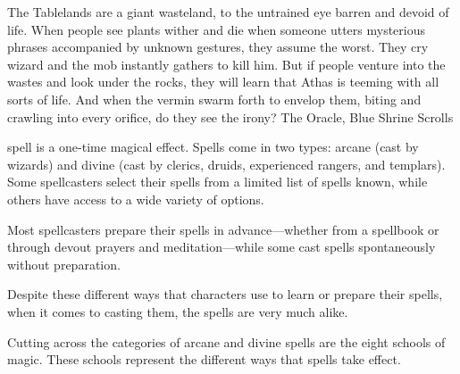 {The Tablelands are a giant wasteland, to the untrained eye barren and devoid of life. When people see plants wither and die when someone utters mysterious phrases accompanied by unknown gestures, they assume the worst. They cry wizard and the mob instantly gathers to kill him. But if people venture into the wastes and look under the rocks, they will learn that Athas is teeming with all sorts of life. And when the vermin swarm forth to envelop them, biting and crawling into every orifice, do they see the irony?}
{The Oracle, Blue Shrine Scrolls}

 spell is a one-time magical effect. Spells come in two types: arcane (cast by wizards) and divine (cast by clerics, druids, experienced rangers, and templars). Some spellcasters select their spells from a limited list of spells known, while others have access to a wide variety of options.

Most spellcasters prepare their spells in advance---whether from a spellbook or through devout prayers and meditation---while some cast spells spontaneously without preparation.

Despite these different ways that characters use to learn or prepare their spells, when it comes to casting them, the spells are very much alike.

Cutting across the categories of arcane and divine spells are the eight schools of magic. These schools represent the different ways that spells take effect.





